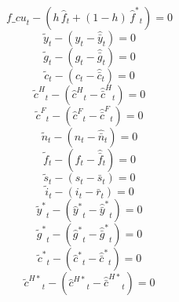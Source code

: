 \begin{dmath}
{f\_cu}_{t}-\left({{h}}\, {{\hat f}}_{t}+\left(1-{{h}}\right)\, {{\hat f^*}}_{t}\right)=0
\end{dmath}
\begin{dmath}
{{\tilde y}}_{t}-\left({{\hat y}}_{t}-{{\hat {\bar y}}}_{t}\right)=0
\end{dmath}
\begin{dmath}
{{\tilde g}}_{t}-\left({{\hat g}}_{t}-{{\hat {\bar g}}}_{t}\right)=0
\end{dmath}
\begin{dmath}
{{\tilde c}}_{t}-\left({{\hat c}}_{t}-{{\hat {\bar c}}}_{t}\right)=0
\end{dmath}
\begin{dmath}
{{\tilde c^H}}_{t}-\left({{\hat c^H}}_{t}-{{\hat {\bar c}^H}}_{t}\right)=0
\end{dmath}
\begin{dmath}
{{\tilde c^F}}_{t}-\left({{\hat c^F}}_{t}-{{\hat {\bar c}^F}}_{t}\right)=0
\end{dmath}
\begin{dmath}
{{\tilde n}}_{t}-\left({{\hat n}}_{t}-{{\hat {\bar n}}}_{t}\right)=0
\end{dmath}
\begin{dmath}
{{\tilde f}}_{t}-\left({{\hat f}}_{t}-{{\hat {\bar f}}}_{t}\right)=0
\end{dmath}
\begin{dmath}
{{\tilde s}}_{t}-\left({{s}}_{t}-{{\bar s}}_{t}\right)=0
\end{dmath}
\begin{dmath}
{{\tilde i}}_{t}-\left({{i}}_{t}-{{\bar r}}_{t}\right)=0
\end{dmath}
\begin{dmath}
{{\tilde y^*}}_{t}-\left({{\hat y^*}}_{t}-{{\hat {\bar y}^*}}_{t}\right)=0
\end{dmath}
\begin{dmath}
{{\tilde g^*}}_{t}-\left({{\hat g^*}}_{t}-{{\hat {\bar g}^*}}_{t}\right)=0
\end{dmath}
\begin{dmath}
{{\tilde c^*}}_{t}-\left({{\hat c^*}}_{t}-{{\hat {\bar c}^*}}_{t}\right)=0
\end{dmath}
\begin{dmath}
{{\tilde c^{H*}}}_{t}-\left({{\hat c^{H*}}}_{t}-{{\hat {\bar c}^{H*}}}_{t}\right)=0
\end{dmath}
